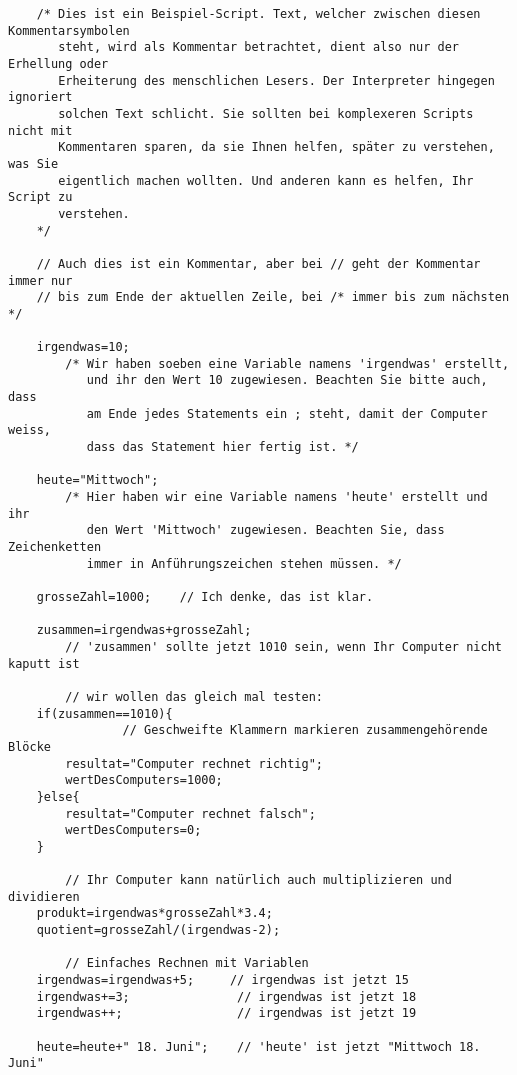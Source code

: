 \documentclass[a4paper]{scrartcl}
\begin{document}
\begin{verbatim}
    /* Dies ist ein Beispiel-Script. Text, welcher zwischen diesen Kommentarsymbolen
       steht, wird als Kommentar betrachtet, dient also nur der Erhellung oder
       Erheiterung des menschlichen Lesers. Der Interpreter hingegen ignoriert
       solchen Text schlicht. Sie sollten bei komplexeren Scripts nicht mit
       Kommentaren sparen, da sie Ihnen helfen, später zu verstehen, was Sie
       eigentlich machen wollten. Und anderen kann es helfen, Ihr Script zu
       verstehen.
    */

    // Auch dies ist ein Kommentar, aber bei // geht der Kommentar immer nur
    // bis zum Ende der aktuellen Zeile, bei /* immer bis zum nächsten */

    irgendwas=10;
        /* Wir haben soeben eine Variable namens 'irgendwas' erstellt,
           und ihr den Wert 10 zugewiesen. Beachten Sie bitte auch, dass
           am Ende jedes Statements ein ; steht, damit der Computer weiss,
           dass das Statement hier fertig ist. */

    heute="Mittwoch";
        /* Hier haben wir eine Variable namens 'heute' erstellt und ihr
           den Wert 'Mittwoch' zugewiesen. Beachten Sie, dass Zeichenketten
           immer in Anführungszeichen stehen müssen. */

    grosseZahl=1000;    // Ich denke, das ist klar.

    zusammen=irgendwas+grosseZahl;
        // 'zusammen' sollte jetzt 1010 sein, wenn Ihr Computer nicht kaputt ist

        // wir wollen das gleich mal testen:
    if(zusammen==1010){
                // Geschweifte Klammern markieren zusammengehörende Blöcke
        resultat="Computer rechnet richtig";
        wertDesComputers=1000;
    }else{
        resultat="Computer rechnet falsch";
        wertDesComputers=0;
    }

        // Ihr Computer kann natürlich auch multiplizieren und dividieren
    produkt=irgendwas*grosseZahl*3.4;
    quotient=grosseZahl/(irgendwas-2);

        // Einfaches Rechnen mit Variablen
    irgendwas=irgendwas+5;     // irgendwas ist jetzt 15
    irgendwas+=3;               // irgendwas ist jetzt 18
    irgendwas++;                // irgendwas ist jetzt 19

    heute=heute+" 18. Juni";    // 'heute' ist jetzt "Mittwoch 18. Juni"


\end{verbatim}
\end{document}
